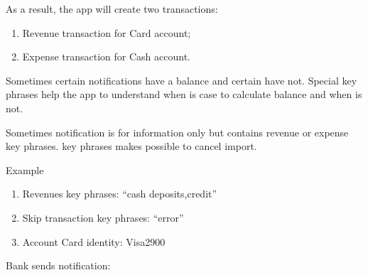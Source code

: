 \documentclass[a4paper,10pt,english]{sphinxmanual}
\begin{document}
\sphinxAtStartPar
As a result, the app will create two transactions:
\begin{enumerate}
%
\item {} 
\sphinxAtStartPar
Revenue transaction for Card account;

\item {} 
\sphinxAtStartPar
Expense transaction for Cash account.

\end{enumerate}

\noindent{}

\noindent{}

\sphinxAtStartPar
Sometimes certain notifications have a balance and certain have not. Special
key phrases help the app to understand when is case to calculate balance and when is not.

\sphinxAtStartPar
Sometimes notification is for information only but contains revenue or expense key phrases.
 key phrases makes possible to cancel import.

\sphinxAtStartPar
Example
\begin{enumerate}
%
\item {} 
\sphinxAtStartPar
Revenues key phrases: “cash deposits,credit”

\item {} 
\sphinxAtStartPar
Skip transaction key phrases: “error”

\item {} 
\sphinxAtStartPar
Account Card identity: Visa2900

\end{enumerate}

\sphinxAtStartPar
Bank sends notification:

\begin{sphinxVerbatim}[commandchars=\\\{\}]
             
\end{sphinxVerbatim}
\end{document}
